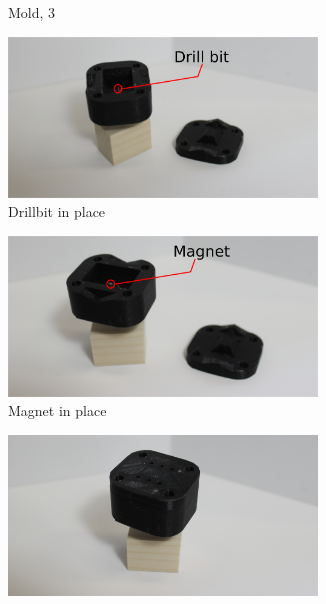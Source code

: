 \begin{figure}
\begin{subfigure}{.45\linewidth}
        \caption{Mold, 3}
        \label{label:MoldStanding}
    \end{subfigure}
    \begin{subfigure}{.45\linewidth}
        \centering
        \includegraphics[width=0.9\textwidth]{Images/mold/drillinserted.png}          
        \caption{Drillbit in place}
        \label{label:drillInserted}
    \end{subfigure}
    \begin{subfigure}{.45\linewidth}
        \centering
        \includegraphics[width=0.9\textwidth]{Images/mold/withmagnet.png}       
        \caption{Magnet in place}
        \label{fig:withmagnet}
    \end{subfigure}
    \begin{subfigure}{.45\linewidth}
        \centering
        \includegraphics[width=0.9\textwidth]{Images/mold/closed.png}    

\end{subfigure}
\end{figure}
